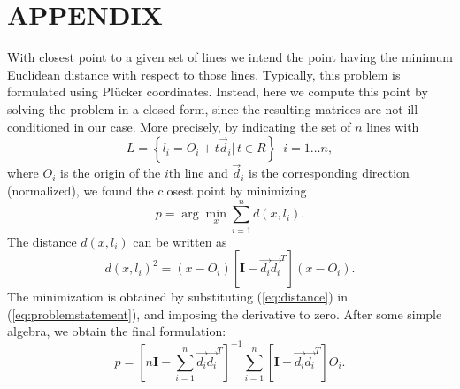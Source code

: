 \documentclass[prodmode,acmtap]{acmlarge}
\begin{document}
\appendix
\section*{APPENDIX}
\setcounter{section}{1}


With closest point to a given set of lines we intend the point
having the minimum Euclidean distance with respect to those lines.
Typically, this problem is formulated using Pl\"{u}cker coordinates.
Instead, here we compute this point by solving the problem in a closed
form, since the resulting matrices are not ill-conditioned in our
case. More precisely, by indicating the set of $n$ lines with
%
\begin{equation}
  L = \left \{ l_i = O_i + t \vec{d}_i | \, t \in {R} \right \} \,\,\, i = 1
  \ldots n,
  \label{eq:setoflines}
\end{equation}
%
where $O_i$ is the origin of the $i$th line and $\vec{d}_i$ is the
corresponding direction (normalized), we found the closest point by
minimizing
%
\begin{equation}
  p = \arg \min_{x} \sum_{i=1}^{n} d(x,l_i).
  \label{eq:problemstatement}
\end{equation}
%
The distance $d(x, l_i)$ can be written as
%
\begin{equation}
  d(x , l_i)^2 = (x - O_i) \left [ \textbf{I} - \vec{d_i} \vec{d_i}^T \right ] (x - O_i).
  \label{eq:distance}
\end{equation}
%
The minimization is obtained by substituting (\ref{eq:distance}) in
(\ref{eq:problemstatement}), and imposing the derivative to zero.
%
After some simple algebra, we obtain the final formulation:
%
\begin{equation}
  p = \left [ n \textbf{I} - \sum_{i=1}^{n} \vec{d_i} \vec{d_i}^T
  \right ]^{-1} \sum_{i=1}^{n} \left [ \textbf{I} - \vec{d_i} \vec{d_i}^T \right ] O_i.
  \label{eq:closedform}
\end{equation}




\end{document}
